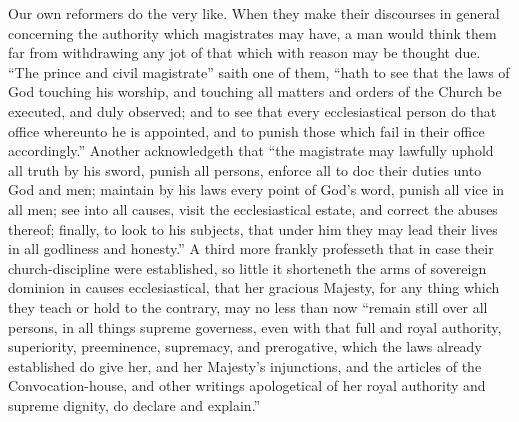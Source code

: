 Our own reformers do the very like. When they make their discourses in general concerning the authority which magistrates may have, a man would think them far from withdrawing  any jot of that which with reason may be thought due. “The prince and civil magistrate” saith one of them, “hath to see that the laws of God touching his worship, and touching all matters and orders of the Church be executed, and duly observed; and to see that every ecclesiastical person do that office whereunto he is appointed, and to punish those which fail in their office accordingly.” Another acknowledgeth that “the magistrate may lawfully uphold all truth by his sword, punish all persons, enforce all to doc their duties unto God and men; maintain by his laws every point of God’s word, punish all vice in all men; see into all causes, visit the ecclesiastical estate, and correct the abuses thereof; finally, to look to his subjects, that under him they may lead their lives in all godliness and honesty.” A third more frankly professeth that in case their church-discipline were established, so little it shorteneth the arms of sovereign dominion in causes ecclesiastical, that her gracious Majesty, for any thing which they teach or hold to the contrary, may no less than now “remain still over all persons, in all things supreme governess, even with that full and royal authority, superiority, preeminence, supremacy, and prerogative, which the laws already established do give her, and her Majesty’s injunctions, and the articles of the Convocation-house, and other writings apologetical of her royal authority and supreme dignity, do declare and explain.”

